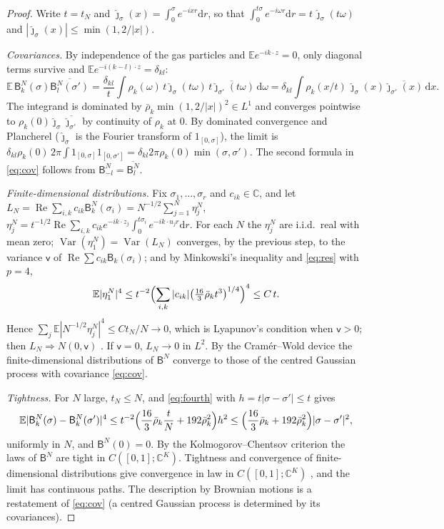 \documentclass[11pt]{article}
\newcommand{\dd}{\mathrm{d}}
\newcommand{\E}{\mathbb{E}}
\newcommand{\C}{\mathbb{C}}
\renewcommand{\Re}{\operatorname{Re}}
\newcommand{\sB}{\mathsf{B}}
\newcommand{\bbar}{\bar\rho}
\theoremstyle{remark}
\begin{document}
\begin{proof}
Write $t=t_N$ and $\hat\jmath_\sigma(x)=\int_0^\sigma e^{-ixr}\dd r$, so that
$\int_0^{t\sigma}e^{-i\omega r}\dd r=t\,\hat\jmath_\sigma(t\omega)$ and
$|\hat\jmath_\sigma(x)|\le\min(1,2/|x|)$.

\emph{Covariances.} By independence of the gas particles and
$\E e^{-ik\cdot z}=0$, only diagonal terms survive and
$\E e^{-i(k-l)\cdot z}=\delta_{kl}$:
\[
  \E\,\sB^N_k(\sigma)\overline{\sB^N_l(\sigma')}
  =\frac{\delta_{kl}}{t}\int\rho_k(\omega)\,
   t\hat\jmath_\sigma(t\omega)\,\overline{t\hat\jmath_{\sigma'}(t\omega)}\,
   \dd\omega
  =\delta_{kl}\int\rho_k(x/t)\,\hat\jmath_\sigma(x)
   \overline{\hat\jmath_{\sigma'}(x)}\,\dd x .
\]
The integrand is dominated by $\bbar_k\min(1,2/|x|)^2\in L^1$ and converges
pointwise to $\rho_k(0)\hat\jmath_\sigma\overline{\hat\jmath_{\sigma'}}$ by
continuity of $\rho_k$ at $0$. By dominated convergence and Plancherel
($\hat\jmath_\sigma$ is the Fourier transform of $1_{[0,\sigma]}$),
the limit is $\delta_{kl}\rho_k(0)\,2\pi\int1_{[0,\sigma]}1_{[0,\sigma']}
=\delta_{kl}2\pi\rho_k(0)\min(\sigma,\sigma')$. The second formula in
\eqref{eq:cov} follows from $\sB^N_{-l}=\overline{\sB^N_l}$.

\emph{Finite-dimensional distributions.} Fix
$\sigma_1,\dots,\sigma_r$ and $c_{ik}\in\C$, and let
$L_N=\Re\sum_{i,k}c_{ik}\sB^N_k(\sigma_i)=N^{-1/2}\sum_{j=1}^N\eta^N_j$,
$\eta^N_j=t^{-1/2}\Re\sum_{i,k}c_{ik}e^{-ik\cdot z_j}
\int_0^{t\sigma_i}e^{-ik\cdot u_jr}\dd r$. For each $N$ the $\eta^N_j$ are
i.i.d.\ real with mean zero; $\operatorname{Var}(\eta^N_1)=\operatorname{Var}(L_N)$
converges, by the previous step, to the variance $\mathsf v$ of
$\Re\sum c_{ik}\sB_k(\sigma_i)$; and by Minkowski's inequality and
\eqref{eq:res} with $p=4$,
\[
  \E|\eta^N_1|^4\le t^{-2}\Bigl(\sum_{i,k}|c_{ik}|
  \bigl(\tfrac{16}{3}\bbar_kt^3\bigr)^{1/4}\Bigr)^4\le C\,t .
\]
Hence $\sum_j\E|N^{-1/2}\eta^N_j|^4\le Ct_N/N\to0$, which is Lyapunov's
condition when $\mathsf v>0$; then $L_N\Rightarrow N(0,\mathsf v)$
\cite{Bill}. If $\mathsf v=0$, $L_N\to0$ in $L^2$. By the Cram\'er--Wold
device the finite-dimensional distributions of $\sB^N$ converge to those of
the centred Gaussian process with covariance \eqref{eq:cov}.

\emph{Tightness.} For $N$ large, $t_N\le N$, and \eqref{eq:fourth} with
$h=t|\sigma-\sigma'|\le t$ gives
\[
  \E|\sB^N_k(\sigma)-\sB^N_k(\sigma')|^4
  \le t^{-2}\Bigl(\frac{16}{3}\bbar_k\frac{t}{N}+192\bbar_k^2\Bigr)h^2
  \le\Bigl(\frac{16}{3}\bbar_k+192\bbar_k^2\Bigr)|\sigma-\sigma'|^2 ,
\]
uniformly in $N$, and $\sB^N(0)=0$. By the Kolmogorov--Chentsov criterion
\cite{Bill,Kall} the laws of $\sB^N$ are tight in $C([0,1];\C^K)$.
Tightness and convergence of finite-dimensional distributions give
convergence in law in $C([0,1];\C^K)$ \cite{Bill}, and the limit has
continuous paths. The description by Brownian motions is a restatement of
\eqref{eq:cov} (a centred Gaussian process is determined by its
covariances).
\end{proof}
\end{document}
